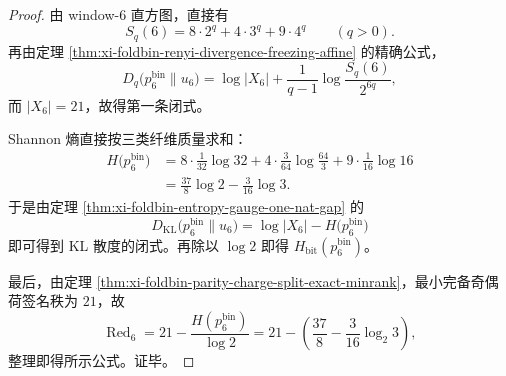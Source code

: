 \begin{proof}
由 window-\(6\) 直方图，直接有
\[
S_q(6)=8\cdot 2^q+4\cdot 3^q+9\cdot 4^q
\qquad(q>0).
\]
再由定理 \ref{thm:xi-foldbin-renyi-divergence-freezing-affine} 的精确公式，
\[
D_q\!\bigl(p_6^{\mathrm{bin}}\|u_6\bigr)
=
\log|X_6|+\frac{1}{q-1}\log\frac{S_q(6)}{2^{6q}},
\]
而 \(|X_6|=21\)，故得第一条闭式。

Shannon 熵直接按三类纤维质量求和：
\[
\begin{aligned}
H\!\bigl(p_6^{\mathrm{bin}}\bigr)
&=
8\cdot \frac{1}{32}\log 32
+4\cdot \frac{3}{64}\log \frac{64}{3}
+9\cdot \frac{1}{16}\log 16\\
&=
\frac{37}{8}\log 2-\frac{3}{16}\log 3.
\end{aligned}
\]
于是由定理 \ref{thm:xi-foldbin-entropy-gauge-one-nat-gap} 的
\[
D_{\mathrm{KL}}\!\bigl(p_6^{\mathrm{bin}}\|u_6\bigr)
=
\log|X_6|-H\!\bigl(p_6^{\mathrm{bin}}\bigr)
\]
即可得到 KL 散度的闭式。再除以 \(\log 2\) 即得 \(H_{\mathrm{bit}}(p_6^{\mathrm{bin}})\)。

最后，由定理 \ref{thm:xi-foldbin-parity-charge-split-exact-minrank}，最小完备奇偶荷签名秩为 \(21\)，故
\[
\operatorname{Red}_6
=
21-\frac{H(p_6^{\mathrm{bin}})}{\log 2}
=
21-\left(\frac{37}{8}-\frac{3}{16}\log_2 3\right),
\]
整理即得所示公式。证毕。
\end{proof}


